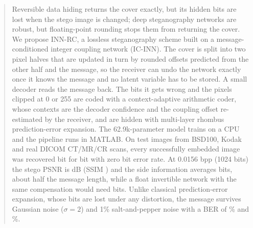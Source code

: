 \begin{abstract}
Reversible data hiding returns the cover exactly, but its hidden bits are lost when the stego image is changed; deep
steganography networks are robust, but floating-point rounding stops them from returning the cover. We
propose INN-RC, a lossless steganography scheme built on a message-conditioned integer coupling network (IC-INN). The
cover is split into two pixel halves that are updated in turn by rounded offsets predicted from the other half and the
message, so the receiver can undo the network exactly once it knows the message and no latent variable has to be
stored. A small decoder reads the message back. The bits it gets wrong and the pixels clipped at 0 or 255 are coded with
a context-adaptive arithmetic coder, whose contexts are the decoder confidence and the coupling offset re-estimated by the
receiver, and are hidden with multi-layer rhombus prediction-error expansion. The 62.9k-parameter model trains on a CPU and the
pipeline runs in MATLAB. On \nImgs{} test images from BSD100, Kodak and real DICOM CT/MR/CR scans,
every successfully embedded image was recovered bit for bit with zero bit error rate. At 0.0156 bpp (1024 bits) the
stego PSNR is \psnrQfour{} dB (SSIM \ssimQfour{}) and the side information averages \auxQfour{} bits, about half the
message length, while a float invertible network with the same compensation would need \auxBASE{} bits. Unlike classical
prediction-error expansion, whose bits are lost under any distortion, the message survives Gaussian noise ($\sigma=2$)
and 1\% salt-and-pepper noise with a BER of \robgausstwoR\% and \robspsponeR\%.
\end{abstract}
